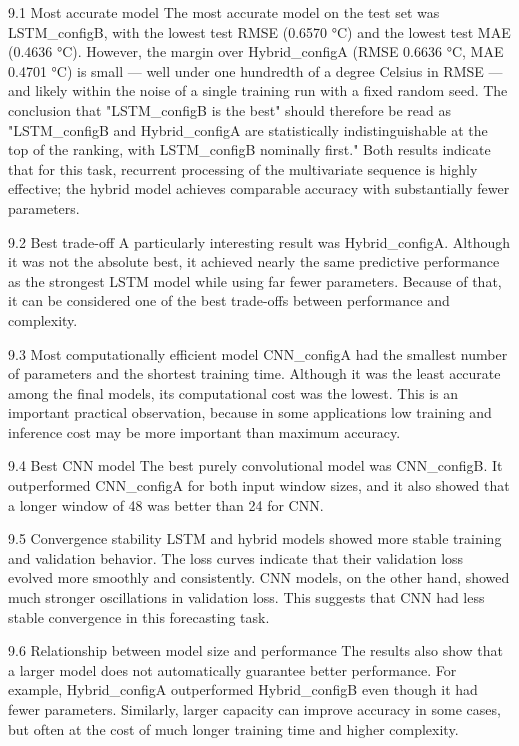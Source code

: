9.1 Most accurate model
The most accurate model on the test set was LSTM_configB, with the lowest test RMSE (0.6570 °C) and the lowest test MAE (0.4636 °C). However, the margin over Hybrid_configA (RMSE 0.6636 °C, MAE 0.4701 °C) is small — well under one hundredth of a degree Celsius in RMSE — and likely within the noise of a single training run with a fixed random seed. The conclusion that "LSTM_configB is the best" should therefore be read as "LSTM_configB and Hybrid_configA are statistically indistinguishable at the top of the ranking, with LSTM_configB nominally first." Both results indicate that for this task, recurrent processing of the multivariate sequence is highly effective; the hybrid model achieves comparable accuracy with substantially fewer parameters.

9.2 Best trade-off
A particularly interesting result was Hybrid_configA. Although it was not the absolute best, it achieved nearly the same predictive performance as the strongest LSTM model while using far fewer parameters. Because of that, it can be considered one of the best trade-offs between performance and complexity.

9.3 Most computationally efficient model
CNN_configA had the smallest number of parameters and the shortest training time. Although it was the least accurate among the final models, its computational cost was the lowest. This is an important practical observation, because in some applications low training and inference cost may be more important than maximum accuracy.

9.4 Best CNN model
The best purely convolutional model was CNN_configB. It outperformed CNN_configA for both input window sizes, and it also showed that a longer window of 48 was better than 24 for CNN.

9.5 Convergence stability
LSTM and hybrid models showed more stable training and validation behavior. The loss curves indicate that their validation loss evolved more smoothly and consistently. CNN models, on the other hand, showed much stronger oscillations in validation loss. This suggests that CNN had less stable convergence in this forecasting task.

9.6 Relationship between model size and performance
The results also show that a larger model does not automatically guarantee better performance. For example, Hybrid_configA outperformed Hybrid_configB even though it had fewer parameters. Similarly, larger capacity can improve accuracy in some cases, but often at the cost of much longer training time and higher complexity.

